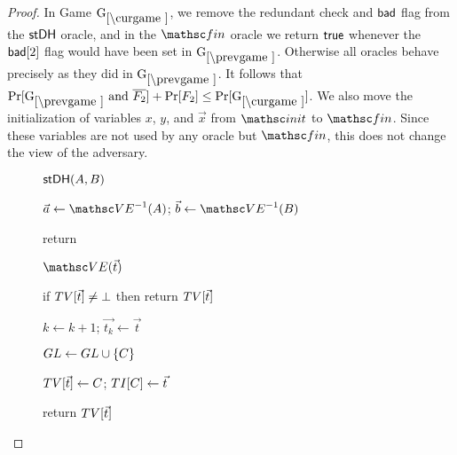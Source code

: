 \begin{proof}
In Game $\curGm*$, we remove the redundant check and $\mathsf{bad}$ flag from the $\mathsf{stDH}$ oracle, and in the $\Finalize$ oracle we return $\mathsf{true}$ whenever the $\mathsf{bad}[2]$ flag would have been set in $\prevGm*$. Otherwise all oracles behave precisely as they did in $\prevGm*$. It follows that $\Pr[\prevGm* \text{ and } \overline{F_2}]+\Pr[F_2] \leq \Pr[\curGm*]$.  We also move the initialization of variables $x$, $y$, and $\vec{x}$ from $\Initialize$ to $\Finalize$. Since these variables are not used by any oracle but $\Finalize$, this does not change the view of the adversary. 

\begin{figure}[tp]
	\begin{minipage}[t]{0.49\textwidth}
		
		\ExptSepSpace
		
		\begin{oracle}{$\mathsf{stDH}(A,B)$}
			\item $\vec{a} \gets \VE^{-1}(A)$; $\vec{b} \gets \VE^{-1}(B)$
			\item {}
			\item return \gamechange{$\false$}{}
		\end{oracle}
		
		\ExptSepSpace
		\begin{algorithm}{$\VE(\vec{t})$}
			\item if $TV[\vec{t}] \neq \bot$ then return $TV[\vec{t}]$
			\item {}
			\item {}
			\item \quad {}
			\item $k \gets k+1$; $\vec{t_k} \gets \vec{t}$
			\item $GL \gets GL \cup \{C\}$
			\item  $TV[\vec{t}] \gets C$; $TI[C] \gets \vec{t}$
			\item return $TV[\vec{t}]$
		\end{algorithm}
	\end{minipage}
	\begin{minipage}[t]{0.49\textwidth}
		

\end{minipage}
\end{figure}
\end{proof}
